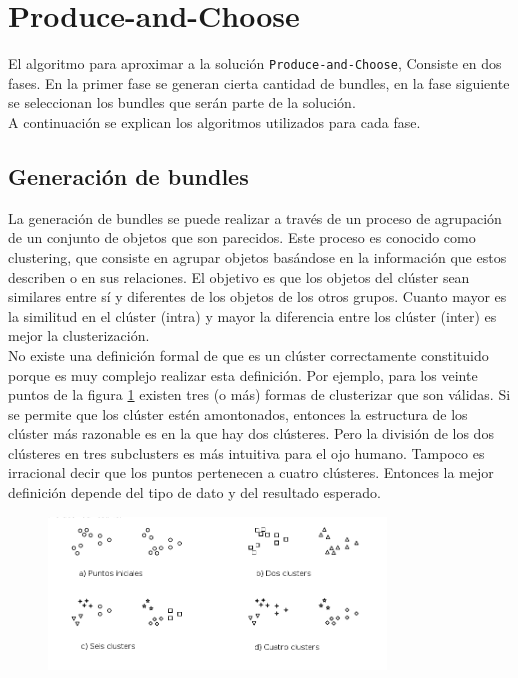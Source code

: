 \section{Produce-and-Choose}
El algoritmo para aproximar a la solución \texttt{Produce-and-Choose}, Consiste en dos fases. En la primer fase se generan cierta cantidad de bundles, en la fase siguiente se seleccionan los bundles que serán parte de la solución.\\
A continuación se explican los algoritmos utilizados para cada fase.
\subsection{Generación de bundles}
La generación de bundles se puede realizar a través de un proceso de agrupación de un conjunto de objetos que son parecidos. Este proceso es conocido como clustering, que consiste en agrupar objetos basándose en la información que estos describen o en sus relaciones. El objetivo es que los objetos del clúster sean similares entre sí y diferentes de los objetos de los otros grupos. Cuanto mayor es la similitud en el clúster (intra) y mayor la diferencia entre los clúster (inter) es mejor la clusterización.\\
No existe una definición formal de que es un clúster correctamente constituido porque es muy complejo realizar esta definición. Por ejemplo, para los veinte puntos de la figura \ref{res:img-howToCluster} existen tres (o más) formas de clusterizar que son válidas. Si se permite que los clúster estén amontonados, entonces la estructura de los clúster más razonable es en la que hay dos clústeres. Pero la división de los dos clústeres en tres subclusters es más intuitiva para el ojo humano. Tampoco es irracional decir que los puntos pertenecen a cuatro clústeres. Entonces la mejor definición depende del tipo de dato y del resultado esperado.

\begin{figure}[H]
  \centering
   \includegraphics[width=0.8\textwidth]{img/howToCluster.png}
   \caption{}
   \label{res:img-howToCluster}
\end{figure}

